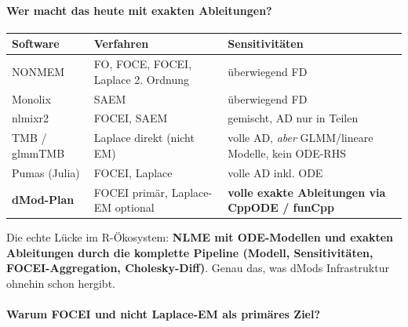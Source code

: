 \documentclass[
]{article}
\newcounter{none} %
\begin{document}
\paragraph{Wer macht das heute mit exakten
Ableitungen?}\label{wer-macht-das-heute-mit-exakten-ableitungen}

{\def\LTcaptype{none} %
\begin{longtable}[]{@{}
  >{\raggedright\arraybackslash}p{}
  >{\raggedright\arraybackslash}p{}
  >{\raggedright\arraybackslash}p{}@{}}
\toprule\noalign{}
\begin{minipage}[b]{\linewidth}\raggedright
Software
\end{minipage} & \begin{minipage}[b]{\linewidth}\raggedright
Verfahren
\end{minipage} & \begin{minipage}[b]{\linewidth}\raggedright
Sensitivitäten
\end{minipage} \\
\midrule\noalign{}
\endhead
\bottomrule\noalign{}
\endlastfoot
NONMEM & FO, FOCE, FOCEI, Laplace 2. Ordnung & überwiegend FD \\
Monolix & SAEM & überwiegend FD \\
nlmixr2 & FOCEI, SAEM & gemischt, AD nur in Teilen \\
TMB / glmmTMB & Laplace direkt (nicht EM) & volle AD, \emph{aber}
GLMM/lineare Modelle, kein ODE-RHS \\
Pumas (Julia) & FOCEI, Laplace & volle AD inkl. ODE \\
\textbf{dMod-Plan} & FOCEI primär, Laplace-EM optional & \textbf{volle
exakte Ableitungen via CppODE / funCpp} \\
\end{longtable}
}

Die echte Lücke im R-Ökosystem: \textbf{NLME mit ODE-Modellen und
exakten Ableitungen durch die komplette Pipeline (Modell,
Sensitivitäten, FOCEI-Aggregation, Cholesky-Diff)}. Genau das, was dMods
Infrastruktur ohnehin schon hergibt.

\paragraph{Warum FOCEI und nicht Laplace-EM als primäres
Ziel?}\label{warum-focei-und-nicht-laplace-em-als-primuxe4res-ziel}
\end{document}
